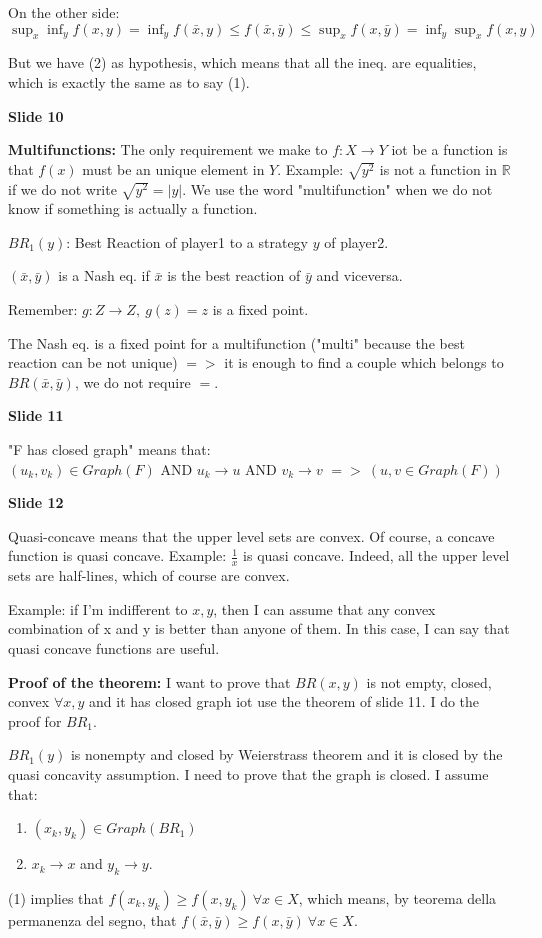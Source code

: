 \documentclass[pt11,a4paper,twoside,reqno,openright]{paper}
\begin{document}
\noindent On the other side: 
$\sup_x{\inf_y{f(x,y)}} = \inf_y{f(\bar{x},y)} \leq f(\bar{x},\bar{y}) 
\leq \sup_x{f(x,\bar{y})} = \inf_y{\sup_x{f(x,y)}}$

\noindent But we have (2) as hypothesis, which means that all the 
ineq. are equalities, which is exactly the same as to say (1).

\bigskip
\noindent \textbf{Slide 10}

\noindent \textbf{Multifunctions:} The only requirement we make to 
$f: X \rightarrow Y$ iot be a function is that $f(x)$ must be an unique 
element in $Y$. Example: $\sqrt{y^2}$ is not a function in $\mathbb{R}$ 
if we do not write $\sqrt{y^2}=|y|$. We use the word "multifunction" 
when we do not know if something is actually a function.

\noindent $BR_1(y)$: Best Reaction of player1 to a strategy $y$ of player2.

\noindent $(\bar{x},\bar{y})$ is a Nash eq. if $\bar{x}$ is the best 
reaction of $\bar{y}$ and viceversa.

\noindent Remember: $g: Z \rightarrow Z, ~g(z) = z$ is a fixed point.

\noindent The Nash eq. is a fixed point for a multifunction ("multi" 
because the best reaction can be not unique) $=>$ it is enough to 
find a couple which belongs to $BR(\bar{x},\bar{y})$, we do not require $=$.

\bigskip
\noindent \textbf{Slide 11}

\noindent "F has closed graph" means that:\\
$(u_k,v_k) \in Graph(F)$ AND 
$u_k \rightarrow u$ AND 
$v_k \rightarrow v$ 
$=> ~(u,v \in Graph(F))$

\bigskip
\noindent \textbf{Slide 12}

\noindent Quasi-concave means that the upper level sets are convex. Of 
course, a concave function is quasi concave. Example: $\frac{1}{x}$ is 
quasi concave. Indeed, all the upper level sets are half-lines, which of 
course are convex.

\noindent Example: if I'm indifferent to $x,y$, then I can assume that any 
convex combination of x and y is better than anyone of them. In this case, 
I can say that quasi concave functions are useful.

\noindent \textbf{Proof of the theorem:} I want to prove that $BR(x,y)$ is 
not empty, closed, convex $\forall x,y$ and it has closed graph iot use 
the theorem of slide 11. I do the proof for $BR_1$.

\noindent $BR_1(y)$ is nonempty and closed by Weierstrass theorem and 
it is closed by the quasi concavity assumption. I need to prove that 
the graph is closed. I assume that:
\begin{enumerate}
	\item $(x_k,y_k) \in Graph(BR_1)$
	\item $x_k \rightarrow x$ and $y_k \rightarrow y$.
\end{enumerate}

(1) implies that $f(x_k,y_k) \geq f(x,y_k) ~\forall x \in X$, which means, 
by teorema della permanenza del segno, that $f(\bar{x},\bar{y}) \geq 
f(x,\bar{y}) ~\forall x \in X$.
\end{document}
